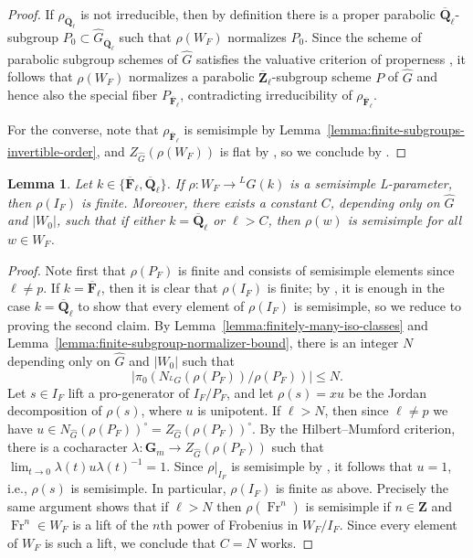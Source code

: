 \documentclass[reqno]{amsart}
\numberwithin{equation}{subsection}
\newcommand{\F}{\mathbf{F}}
\newcommand{\G}{\mathbf{G}}
\newcommand{\Q}{\mathbf{Q}}
\newcommand{\Z}{\mathbf{Z}}
\newcommand{\ol}[1]{\overline{#1}}
\newcommand{\wh}[1]{\widehat{#1}}
\newcommand{\co}{\colon}
\newcommand{\ld}{{}^L}
\DeclareMathOperator{\Fr}{Fr}
\newtheorem{lemma}[thm]{Lemma}
\theoremstyle{remark}
\numberwithin{equation}{subsection}
\numberwithin{figure}{subsection}
\begin{document}
\begin{proof}
If $\rho_{\ol\Q_\ell}$ is not irreducible, then by definition there is a proper parabolic $\ol\Q_\ell$-subgroup $P_0 \subset \wh G_{\ol\Q_\ell}$ such that $\rho(W_F)$ normalizes $P_0$. Since the scheme of parabolic subgroup schemes of $\wh G$ satisfies the valuative criterion of properness \cite[Corollary 5.2.9]{Con14}, it follows that $\rho(W_F)$ normalizes a parabolic $\ol\Z_\ell$-subgroup scheme $P$ of $\wh G$ and hence also the special fiber $P_{\ol\F_\ell}$, contradicting irreducibility of $\rho_{\ol\F_\ell}$.

For the converse, note that $\rho_{\ol\F_\ell}$ is semisimple by Lemma~\ref{lemma:finite-subgroups-invertible-order}, and $Z_{\wh G}(\rho(W_F))$ is flat by \cite[Lemma A.1]{DHKM25}, so we conclude by \cite[Lemma~10.1.7]{CF26a}.
\end{proof}

\begin{lemma}\label{lemma:semisimple-image}
Let $k \in \{\ol\F_\ell, \ol\Q_\ell\}$. If $\rho\co W_F \to \ld G(k)$ is a semisimple L-parameter, then $\rho(I_F)$ is finite. Moreover, there exists a constant $C$, depending only on $\wh G$ and $|W_0|$, such that if either $k = \ol\Q_\ell$ or $\ell > C$, then $\rho(w)$ is semisimple for all $w \in W_F$.
\end{lemma}

\begin{proof}
Note first that $\rho(P_F)$ is finite and consists of semisimple elements since $\ell \neq p$. If $k = \ol\F_\ell$, then it is clear that $\rho(I_F)$ is finite; by \cite[Lemma 2.2]{DHKM25}, it is enough in the case $k = \ol\Q_\ell$ to show that every element of $\rho(I_F)$ is semisimple, so we reduce to proving the second claim. By Lemma~\ref{lemma:finitely-many-iso-classes} and Lemma~\ref{lemma:finite-subgroup-normalizer-bound}, there is an integer $N$ depending only on $\wh G$ and $|W_0|$ such that
\[
|\pi_0(N_{\ld G}(\rho(P_F))/\rho(P_F))| \leq N.
\]
Let $s \in I_F$ lift a pro-generator of $I_F/P_F$, and let $\rho(s) = xu$ be the Jordan decomposition of $\rho(s)$, where $u$ is unipotent. If $\ell > N$, then since $\ell \neq p$ we have $u \in N_{\wh G}(\rho(P_F))^\circ = Z_{\wh G}(\rho(P_F))^\circ$. By the Hilbert--Mumford criterion, there is a cocharacter $\lambda\co \G_m \to Z_{\wh G}(\rho(P_F))$ such that $\lim_{t \to 0} \lambda(t)u\lambda(t)^{-1} = 1$. Since $\rho|_{I_F}$ is semisimple by \cite[Theorem 3.10]{BMR05}, it follows that $u = 1$, i.e., $\rho(s)$ is semisimple. In particular, $\rho(I_F)$ is finite as above. Precisely the same argument shows that if $\ell > N$ then $\rho(\Fr^n)$ is semisimple if $n \in \Z$ and $\Fr^n \in W_F$ is a lift of the $n$th power of Frobenius in $W_F/I_F$. Since every element of $W_F$ is such a lift, we conclude that $C = N$ works.
\end{proof}
\end{document}
